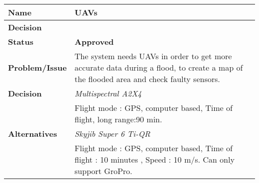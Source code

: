 \begin{table}[H]
	\begin{tabular}{L{0.2\textwidth} L{0.6\textwidth}}
						
		\textbf{Name}         & \textbf{UAVs}                                                                                                                                                  \\ \toprule
		\textbf{Decision}      & \textbf{}                                                                                                                                                             \\ \midrule

		\textbf{Status}        & \textbf{Approved}                                                                                                                                                          \\ \midrule
		\textbf{Problem/Issue} & The system needs UAVs in order to get more accurate data during a flood, to create a map of the flooded area and check faulty sensors.                                                                    \\ \midrule
	\textbf{Decision}       &  	\textit{Multispectral A2X4} \\ 
							& Flight mode : GPS, computer based, Time of flight, long range:90 min. \\                                                                                        \midrule
		\textbf{Alternatives} 
		                       & \textit {Skyjib Super 6 Ti-QR}                                                                                                                                             \\
		                       & Flight mode : GPS, computer based, Time of flight : 10 minutes , Speed : 10 m/s. Can only support GroPro.                                                                
		                       

\end{tabular}
\end{table}
